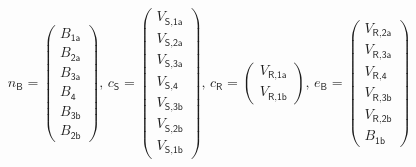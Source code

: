 %
\begin{equation}
n_\textsf{B} = \left(\begin{array}{c} B_\textsf{1a} \\ B_\textsf{2a} \\ B_\textsf{3a} \\ B_\textsf{4} \\ B_\textsf{3b} \\ B_\textsf{2b} \end{array}\right),\, c_\textsf{S} = \left(\begin{array}{c} V_\textsf{S,1a} \\ V_\textsf{S,2a} \\ V_\textsf{S,3a} \\ V_\textsf{S,4} \\ V_\textsf{S,3b} \\ V_\textsf{S,2b} \\ V_\textsf{S,1b} \end{array}\right), \, c_\textsf{R} = \left(\begin{array}{c} V_\textsf{R,1a} \\ V_\textsf{R,1b} \end{array}\right),\, e_\textsf{B} = \left(\begin{array}{c} V_\textsf{R,2a} \\ V_\textsf{R,3a} \\ V_\textsf{R,4} \\ V_\textsf{R,3b} \\ V_\textsf{R,2b} \\ B_\textsf{1b} \end{array}\right)
\label{equ_04ModellLuft24a}
\end{equation}
%

